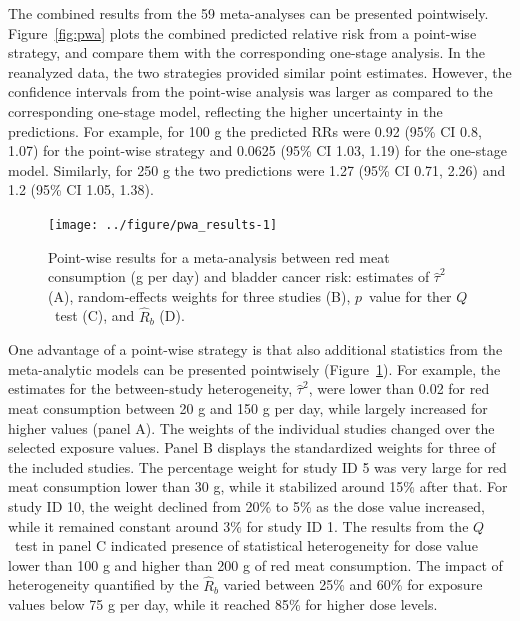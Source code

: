 \documentclass[11pt,a4paper,twoside,openany]{book}\usepackage{knitr}
\begin{document}
{\begin{knitrout}
\end{knitrout}

\noindent The combined results from the 59 meta-analyses can be presented pointwisely. Figure~\ref{fig:pwa} plots the combined predicted relative risk from a point-wise strategy, and compare them with the corresponding one-stage analysis. In the reanalyzed data, the two strategies provided similar point estimates. However, the confidence intervals from the point-wise analysis was larger as compared to the corresponding one-stage model, reflecting the higher uncertainty in the predictions. For example, for 100 g the predicted RRs were 0.92 (95\% CI 0.8, 1.07) for the point-wise strategy and 0.0625 (95\% CI 1.03, 1.19) for the one-stage model. Similarly, for 250 g the two predictions were 1.27 (95\% CI 0.71, 2.26) and 1.2 (95\% CI 1.05, 1.38).

\begin{knitrout}\footnotesize
{}\color{fgcolor}\begin{figure}[ht!]

{\centering \texttt{[image: ../figure/pwa\_results-1]} 

}

\caption[Point-wise results for a meta-analysis between red meat consumption (g per day) and bladder cancer risk]{Point-wise results for a meta-analysis between red meat consumption (g per day) and bladder cancer risk: estimates of $\hat \tau^2$ (A), random-effects weights for three studies (B), $p$~value for ther $Q$~test (C), and $\hat R_b$ (D).}\label{fig:pwa_results}
\end{figure}


\end{knitrout}

One advantage of a point-wise strategy is that also additional statistics from the meta-analytic models can be presented pointwisely (Figure~\ref{fig:pwa_results}). For example, the estimates for the between-study heterogeneity, $\hat \tau^2$, were lower than 0.02 for red meat consumption between 20 g and 150 g per day, while largely increased for higher values (panel A). The weights of the individual studies changed over the selected exposure values. Panel B displays the standardized weights for three of the included studies. The percentage weight for study ID 5 was very large for red meat consumption lower than 30 g, while it stabilized around 15\% after that. For study ID 10, the weight declined from 20\% to 5\% as the dose value increased, while it remained constant around 3\% for study ID 1. The results from the $Q$~test in panel C indicated presence of statistical heterogeneity for dose value lower than 100 g and higher than 200 g of red meat consumption. The impact of heterogeneity quantified by the $\hat R_b$ varied between 25\% and 60\% for exposure values below 75 g per day, while it reached 85\% for higher dose levels.





}
\end{document}
